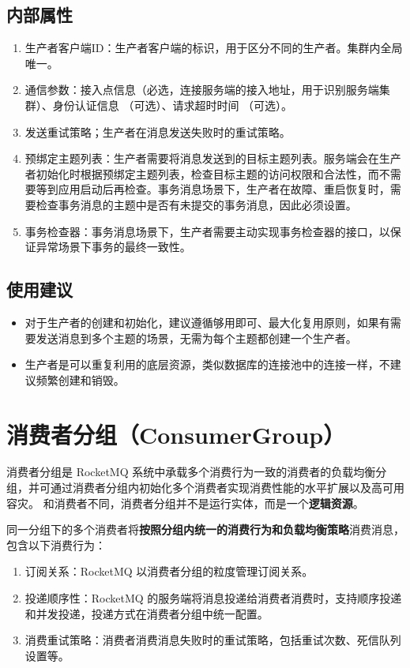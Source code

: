 \documentclass[11pt, a4paper, oneside, fontset=none]{ctexbook}
\begin{document}
\subsection{内部属性}
\begin{enumerate}
  \item 生产者客户端ID：生产者客户端的标识，用于区分不同的生产者。集群内全局唯一。
  \item 通信参数：接入点信息（必选，连接服务端的接入地址，用于识别服务端集群）、身份认证信息 （可选）、请求超时时间 （可选）。
  \item 发送重试策略；生产者在消息发送失败时的重试策略。
  \item 预绑定主题列表：生产者需要将消息发送到的目标主题列表。服务端会在生产者初始化时根据预绑定主题列表，检查目标主题的访问权限和合法性，而不需要等到应用启动后再检查。事务消息场景下，生产者在故障、重启恢复时，需要检查事务消息的主题中是否有未提交的事务消息，因此必须设置。
  \item 事务检查器：事务消息场景下，生产者需要主动实现事务检查器的接口，以保证异常场景下事务的最终一致性。
\end{enumerate}

\subsection{使用建议}
\begin{itemize}
  \item 对于生产者的创建和初始化，建议遵循够用即可、最大化复用原则，如果有需要发送消息到多个主题的场景，无需为每个主题都创建一个生产者。
  \item 生产者是可以重复利用的底层资源，类似数据库的连接池中的连接一样，不建议频繁创建和销毁。
\end{itemize}

\section{消费者分组（ConsumerGroup）}
消费者分组是 RocketMQ 系统中承载多个消费行为一致的消费者的负载均衡分组，并可通过消费者分组内初始化多个消费者实现消费性能的水平扩展以及高可用容灾。
和消费者不同，消费者分组并不是运行实体，而是一个{\bfseries\kaishu 逻辑资源}。

同一分组下的多个消费者将\textbf{按照分组内统一的消费行为和负载均衡策略}消费消息，包含以下消费行为：
\begin{enumerate}
  \item 订阅关系：RocketMQ 以消费者分组的粒度管理订阅关系。
  \item 投递顺序性：RocketMQ 的服务端将消息投递给消费者消费时，支持顺序投递和并发投递，投递方式在消费者分组中统一配置。
  \item 消费重试策略：消费者消费消息失败时的重试策略，包括重试次数、死信队列设置等。
\end{enumerate}
\end{document}
